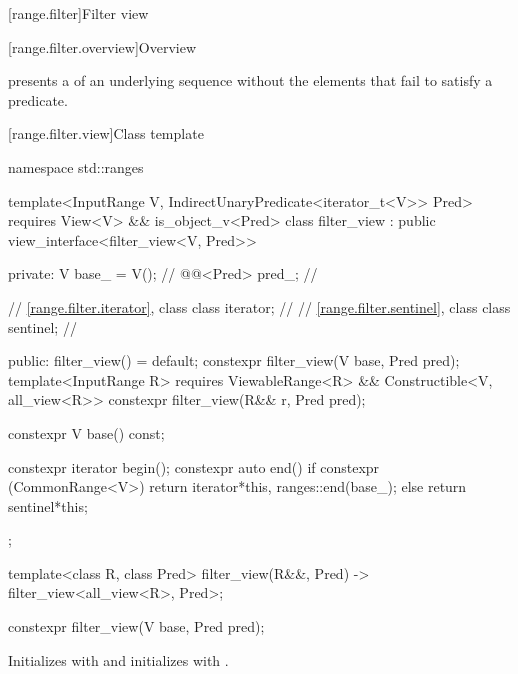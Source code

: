 [range.filter]{Filter view}

[range.filter.overview]{Overview}

\pnum
{} presents a  of an underlying sequence
without the elements that fail to satisfy a predicate.

\pnum
\begin{example}
\end{example}

[range.filter.view]{Class template }

\begin{codeblock}
namespace std::ranges {
  template<InputRange V, IndirectUnaryPredicate<iterator_t<V>> Pred>
    requires View<V> && is_object_v<Pred>
  class filter_view : public view_interface<filter_view<V, Pred>> {
  private:
    V base_ = V();              // \expos
    @@<Pred> pred_;    // \expos

    // \ref{range.filter.iterator}, class 
    class iterator;             // \expos
    // \ref{range.filter.sentinel}, class 
    class sentinel;             // \expos

  public:
    filter_view() = default;
    constexpr filter_view(V base, Pred pred);
    template<InputRange R>
      requires ViewableRange<R> && Constructible<V, all_view<R>>
    constexpr filter_view(R&& r, Pred pred);

    constexpr V base() const;

    constexpr iterator begin();
    constexpr auto end() {
      if constexpr (CommonRange<V>)
        return iterator{*this, ranges::end(base_)};
      else
        return sentinel{*this};
    }
  };

  template<class R, class Pred>
    filter_view(R&&, Pred) -> filter_view<all_view<R>, Pred>;
}
\end{codeblock}

%
\begin{itemdecl}
constexpr filter_view(V base, Pred pred);
\end{itemdecl}

\begin{itemdescr}
\pnum
\effects Initializes  with  and initializes
 with .
\end{itemdescr}

